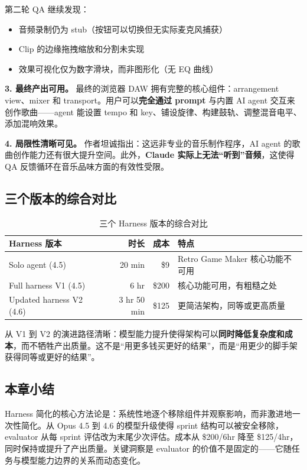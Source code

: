 第二轮 QA 继续发现：
\begin{itemize}[leftmargin=1.5em]
    \item 音频录制仍为 stub（按钮可以切换但无实际麦克风捕获）
    \item Clip 的边缘拖拽缩放和分割未实现
    \item 效果可视化仅为数字滑块，而非图形化（无 EQ 曲线）
\end{itemize}

\textbf{3. 最终产出可用。} 最终的浏览器 DAW 拥有完整的核心组件：arrangement view、mixer 和 transport。用户可以\textbf{完全通过 prompt} 与内置 AI agent 交互来创作歌曲——agent 能设置 tempo 和 key、铺设旋律、构建鼓轨、调整混音电平、添加混响效果。

\textbf{4. 局限性清晰可见。} 作者坦诚指出：这远非专业的音乐制作程序，AI agent 的歌曲创作能力还有很大提升空间。此外，\textbf{Claude 实际上无法``听到''音频}，这使得 QA 反馈循环在音乐品味方面的有效性受限。

\subsection{三个版本的综合对比}

\begin{table}[H]
\centering
\renewcommand{\arraystretch}{1.3}
\begin{tabular}{p{3.5cm}rrp{5cm}}
\toprule
\textbf{Harness 版本} & \textbf{时长} & \textbf{成本} & \textbf{特点} \\
\midrule
Solo agent (4.5) & 20 min & \$9 & Retro Game Maker 核心功能不可用 \\
Full harness V1 (4.5) & 6 hr & \$200 & 核心功能可用，有粗糙之处 \\
Updated harness V2 (4.6) & 3 hr 50 min & \$125 & 更简洁架构，同等或更高质量 \\
\bottomrule
\end{tabular}
\caption{三个 Harness 版本的综合对比}
\end{table}

从 V1 到 V2 的演进路径清晰：模型能力提升使得架构可以\textbf{同时降低复杂度和成本}，而不牺牲产出质量。这不是``用更多钱买更好的结果''，而是``用更少的脚手架获得同等或更好的结果''。

\subsection{本章小结}

Harness 简化的核心方法论是：系统性地逐个移除组件并观察影响，而非激进地一次性简化。从 Opus 4.5 到 4.6 的模型升级使得 sprint 结构可以被安全移除，evaluator 从每 sprint 评估改为末尾少次评估。成本从 \$200/6hr 降至 \$125/4hr，同时保持或提升了产出质量。关键洞察是 evaluator 的价值不是固定的——它随任务与模型能力边界的关系而动态变化。


